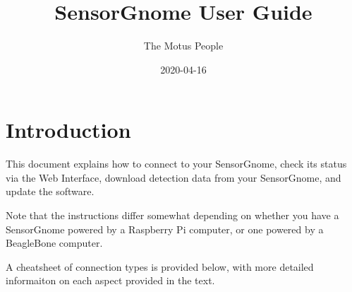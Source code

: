\documentclass[
]{book}
\title{SensorGnome User Guide}
\author{The Motus People}
\date{2020-04-16}
\begin{document}
\maketitle

{
\setcounter{tocdepth}{1}
\tableofcontents
}
\hypertarget{introduction}{%
\chapter{Introduction}\label{introduction}}

This document explains how to connect to your SensorGnome, check its status via the Web Interface, download detection data from your SensorGnome, and update the software.

Note that the instructions differ somewhat depending on whether you have a SensorGnome powered by a Raspberry Pi computer, or one powered by a BeagleBone computer.

A cheatsheet of connection types is provided below, with more detailed informaiton on each aspect provided in the text.
\end{document}
